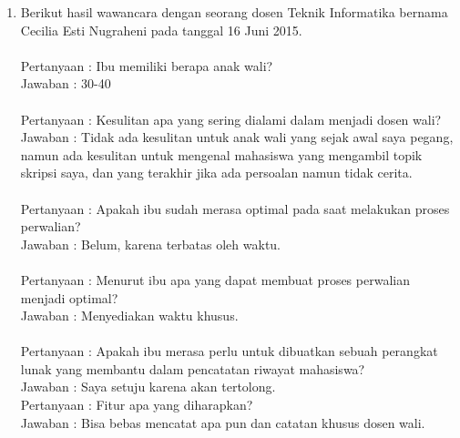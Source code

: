 \begin{enumerate}
\item Berikut hasil wawancara dengan seorang dosen Teknik Informatika bernama Cecilia Esti Nugraheni pada tanggal 16 Juni 2015.\\\\
Pertanyaan : Ibu memiliki berapa anak wali?\\
Jawaban : 30-40\\\\
Pertanyaan : Kesulitan apa yang sering dialami dalam menjadi dosen wali?\\
Jawaban : Tidak ada kesulitan untuk anak wali yang sejak awal saya pegang, namun ada kesulitan untuk mengenal mahasiswa yang mengambil topik skripsi saya, dan yang terakhir jika ada persoalan namun tidak cerita.\\\\
Pertanyaan : Apakah ibu sudah merasa optimal pada saat melakukan proses perwalian?\\
Jawaban : Belum, karena terbatas oleh waktu.\\\\
Pertanyaan : Menurut ibu apa yang dapat membuat proses perwalian menjadi optimal?\\
Jawaban : Menyediakan waktu khusus.\\\\
Pertanyaan : Apakah ibu merasa perlu untuk dibuatkan sebuah perangkat lunak yang membantu dalam pencatatan riwayat mahasiswa?\\
Jawaban : Saya setuju karena akan tertolong.\\
Pertanyaan : Fitur apa yang diharapkan?\\
Jawaban : Bisa bebas mencatat apa pun dan catatan khusus dosen wali.\\


\end{enumerate}
